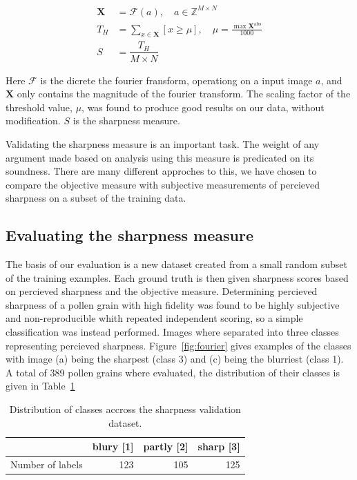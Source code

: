 \begin{equation}\label{eq:sharp}
  \begin{split}
    \mathbf{X} &= \mathcal{F}(a),\quad a\in \mathbb{Z}^{M\times N}\\
    T_H &= \sum_{x\in\mathbf{X}}[x\ge\mu],\quad \mu=\frac{\max \mathbf{X^{\mathrm{abs}}}}{1000}\\
    S &= \dfrac{T_H}{M\times N}
  \end{split}
\end{equation}

Here \(\mathcal{F}\) is the dicrete the fourier fransform, operationg on a input image \(a\), and \(\mathbf{X}\) only contains the magnitude of the fourier transform.
The scaling factor of the threshold value, \(\mu \), was found to produce good results on our data, without modification. \(S\) is the sharpness measure.

Validating the sharpness measure is an important task.
The weight of any argument made based on analysis using this measure is predicated on its soundness.
There are many different approches to this, we have chosen to compare the objective measure with subjective measurements of percieved sharpness on a subset of the training data.

\subsection{Evaluating the sharpness measure}
The basis of our evaluation is a new dataset created from a small random subset of the training examples.
Each ground truth is then given sharpness scores based on percieved sharpness and the objective measure.
Determining percieved sharpness of a pollen grain with high fidelity was found to be highly subjective and non-reproducible whith repeated independent scoring, so a simple classification was instead performed.
Images where separated into three classes representing percieved sharpness.
Figure~\ref{fig:fourier} gives examples of the classes with image (a) being the sharpest (class 3) and (c) being the blurriest (class 1).
A total of 389 pollen grains where evaluated, the distribution of their classes is given in Table~\ref{tab:sharpness}

\begin{table}[htbp]
  \caption[Sharpness dataset distribution]{Distribution of classes accross the sharpness validation dataset.}\label{tab:sharpness}
  \centering 
  \begin{tabular}{lrrr} \toprule
    & blury [1] & partly [2] & sharp [3]  \\ \midrule
    Number of labels & 123 & 105 & 125 \\ \bottomrule
  \end{tabular}
\end{table}

